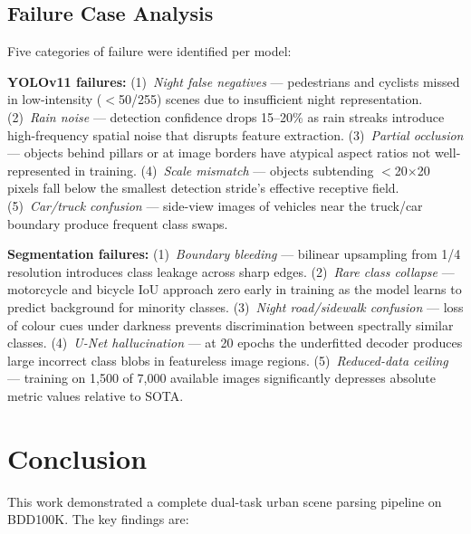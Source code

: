 \documentclass[10pt,twocolumn]{article}
\begin{document}
\subsection{Failure Case Analysis}

Five categories of failure were identified per model:

\textbf{YOLOv11 failures:}
(1)~\textit{Night false negatives} --- pedestrians and cyclists missed in
low-intensity ($<$50/255) scenes due to insufficient night representation.
(2)~\textit{Rain noise} --- detection confidence drops 15--20\% as rain
streaks introduce high-frequency spatial noise that disrupts feature extraction.
(3)~\textit{Partial occlusion} --- objects behind pillars or at image borders
have atypical aspect ratios not well-represented in training.
(4)~\textit{Scale mismatch} --- objects subtending $<$20$\times$20 pixels
fall below the smallest detection stride's effective receptive field.
(5)~\textit{Car/truck confusion} --- side-view images of vehicles near the
truck/car boundary produce frequent class swaps.

\textbf{Segmentation failures:}
(1)~\textit{Boundary bleeding} --- bilinear upsampling from 1/4 resolution
introduces class leakage across sharp edges.
(2)~\textit{Rare class collapse} --- motorcycle and bicycle IoU approach zero
early in training as the model learns to predict background for minority classes.
(3)~\textit{Night road/sidewalk confusion} --- loss of colour cues under
darkness prevents discrimination between spectrally similar classes.
(4)~\textit{U-Net hallucination} --- at 20 epochs the underfitted decoder
produces large incorrect class blobs in featureless image regions.
(5)~\textit{Reduced-data ceiling} --- training on 1,500 of 7,000 available
images significantly depresses absolute metric values relative to SOTA.

\section{Conclusion}
\label{sec:conclusion}

This work demonstrated a complete dual-task urban scene parsing pipeline on
BDD100K.  The key findings are:
\end{document}
